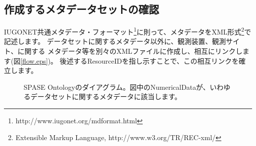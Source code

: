 \subsection{作成するメタデータセットの確認}
IUGONET共通メタデータ・フォーマット\footnote{http://www.iugonet.org/mdformat.html}に則って、メタデータをXML形式\footnote{Extensible Markup Language, http://www.w3.org/TR/REC-xml/}で記述します。
データセットに関するメタデータ以外に、観測装置、観測サイト、に関する
メタデータ等を別々のXMLファイルに作成し、相互にリンクします(図\ref{flow.eps})。
後述するResourceIDを指し示すことで、この相互リンクを確立します。

\begin{figure}[H]
\begin{center}
\caption{SPASE Ontologyのダイアグラム。図中のNumericalDataが、いわゆるデータセットに関するメタデータに該当します。}
\label{spaseOntology}
\end{center}
\end{figure}

